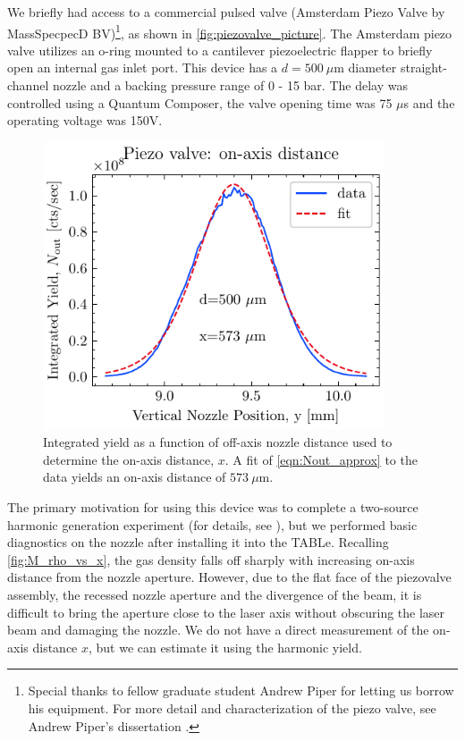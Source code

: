 We briefly had access to a commercial pulsed valve (Amsterdam Piezo Valve by MassSpecpecD BV)\footnote{Special thanks to fellow graduate student Andrew Piper for letting us borrow his equipment. For more detail and characterization of the piezo valve, see Andrew Piper's dissertation \cite{piperAndrewPiperDissertation2022}.}, as shown in \cref{fig:piezovalve_picture}. The Amsterdam piezo valve utilizes an o-ring mounted to a cantilever piezoelectric flapper to briefly open an internal gas inlet port. This device has a $d = 500 \ \mu \textrm{m}$ diameter straight-channel nozzle and a backing pressure range of 0 - 15 bar. The delay was controlled using a Quantum Composer, the valve opening time was 75 $\mu$s and the operating voltage was 150V.


\begin{figure}
	\centering
	\includegraphics[width=0.9\textwidth]{figures/chap3/piezovalve_vscan.pdf}
	\caption{Integrated yield as a function of off-axis nozzle distance used to determine the on-axis distance, $x$. A fit of \cref{eqn:Nout_approx} to the data yields an on-axis distance of $573 \ \mu \textrm{m}$.}
	\label{fig:piezovalve_vscan}
\end{figure}

The primary motivation for using this device was to complete a two-source harmonic generation experiment (for details, see \cite{hagemanComplexAttosecondTransientAbsorption2020}), but we performed basic diagnostics on the nozzle after installing it into the TABLe. Recalling \cref{fig:M_rho_vs_x}, the gas density falls off sharply with increasing on-axis distance from the nozzle aperture. However, due to the flat face of the piezovalve assembly, the recessed nozzle aperture and the divergence of the beam, it is difficult to bring the aperture close to the laser axis without obscuring the laser beam and damaging the nozzle. We do not have a direct measurement of the on-axis distance $x$, but we can estimate it using the harmonic yield.

